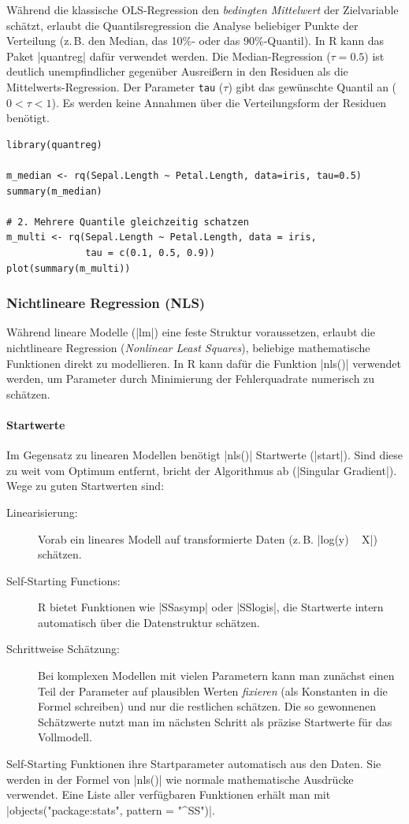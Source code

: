 \documentclass[10pt,twocolumn]{scrartcl}
\renewcommand{\lstinline}{\mycoloredinline}
\begin{document}
Während die klassische OLS-Regression den \emph{bedingten Mittelwert} der Zielvariable schätzt, erlaubt die Quantilsregression die Analyse beliebiger Punkte der Verteilung (z.\,B. den Median, das 10\%- oder das 90\%-Quantil). In R kann das Paket \lstinline|quantreg| dafür verwendet werden. Die Median-Regression ($\tau = 0.5$) ist deutlich unempfindlicher gegenüber Ausreißern in den Residuen als die Mittelwerts-Regression. Der Parameter \texttt{tau} ($\tau$) gibt das gewünschte Quantil an ($0 < \tau < 1$). Es werden keine Annahmen über die Verteilungsform der Residuen benötigt.

\begin{lstlisting}
library(quantreg)

m_median <- rq(Sepal.Length ~ Petal.Length, data=iris, tau=0.5)
summary(m_median)

# 2. Mehrere Quantile gleichzeitig schatzen
m_multi <- rq(Sepal.Length ~ Petal.Length, data = iris,
              tau = c(0.1, 0.5, 0.9))
plot(summary(m_multi))
\end{lstlisting}


\subsubsection{Nichtlineare Regression (NLS)}

Während lineare Modelle (\lstinline|lm|) eine feste Struktur voraussetzen, erlaubt die nichtlineare Regression (\emph{Nonlinear Least Squares}), beliebige mathematische Funktionen direkt zu modellieren. In R kann dafür die Funktion \lstinline|nls()| verwendet werden, um Parameter durch Minimierung der Fehlerquadrate numerisch zu schätzen.

\paragraph{Startwerte}
Im Gegensatz zu linearen Modellen benötigt \lstinline|nls()| Startwerte (\lstinline|start|). Sind diese zu weit vom Optimum entfernt, bricht der Algorithmus ab (\lstinline|Singular Gradient|). Wege zu guten Startwerten sind:
\begin{description}
\item[Linearisierung:] Vorab ein lineares Modell auf transformierte Daten (z.\,B. \lstinline|log(y) ~ X|) schätzen.
\item[Self-Starting Functions:] R bietet Funktionen wie \lstinline|SSasymp| oder \lstinline|SSlogis|, die Startwerte intern automatisch über die Datenstruktur schätzen.
\item[Schrittweise Schätzung:] Bei komplexen Modellen mit vielen Parametern kann man zunächst einen Teil der Parameter auf plausiblen Werten \emph{fixieren} (als Konstanten in die Formel schreiben) und nur die restlichen schätzen. Die so gewonnenen Schätzwerte nutzt man im nächsten Schritt als präzise Startwerte für das Vollmodell.
\end{description}
Self-Starting Funktionen ihre Startparameter automatisch aus den Daten. Sie werden in der Formel von \lstinline|nls()| wie normale mathematische Ausdrücke verwendet. Eine Liste aller verfügbaren Funktionen erhält man mit \lstinline|objects("package:stats", pattern = "^SS")|.
\end{document}
